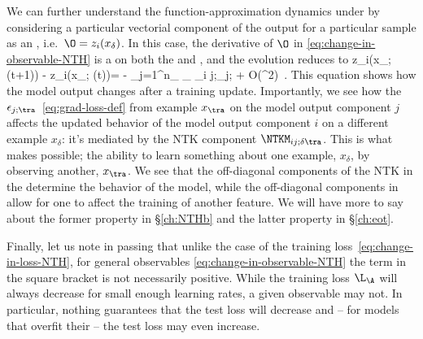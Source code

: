 We can further understand the function-approximation dynamics under  by considering a particular vectorial component of the output for a particular sample as an , i.e.~$\O=z_{i}(x_{\delta})$. In this case, the derivative of $\O$ in \eqref{eq:change-in-observable-NTH} is a  on both the  and , and the evolution reduces to
\be\label{eq:NTK-change-in-output}
z_{i}\Big(x_{\delta}; \theta(t+1)\Big) - z_{i}\Big(x_{\delta}; \theta(t)\Big)= - \eta\sum_{j=1}^{n_{}} \sum_{\tra \in \A}     \NTKM_{i j;\delta\tra}\epsilon_{j;\tra}  + O(\eta^2)\, .
\ee
This equation shows how the model output changes after a training update. Importantly, we see how the 
$\epsilon_{j;\tra}$~\eqref{eq:grad-loss-def} from example $x_{\tra}$ on the model output component $j$ affects the updated behavior of the model output component $i$ on a different example $x_{\delta}$: it's mediated by the NTK component $\NTKM_{i j;\delta\tra}$. This is what makes  possible; the ability to learn something about one example, $x_{\delta}$, by observing another, $x_{\tra}$. We see that the off-diagonal components of the NTK in the  determine the  behavior of the model, while the off-diagonal components in  allow for one  to affect the training of another feature. We will have more to say about the former property in \S\ref{ch:NTHb} and the latter property in \S\ref{ch:eot}.





Finally, let us note in passing that unlike the case of the training loss~\eqref{eq:change-in-loss-NTH}, for general observables \eqref{eq:change-in-observable-NTH} the term in the square bracket is not necessarily positive. While the training loss $\L_\A$ will always decrease for small enough learning rates, a given observable may not.
In particular, nothing guarantees that the test loss will decrease and -- for models that overfit their  -- the test loss may even increase.















